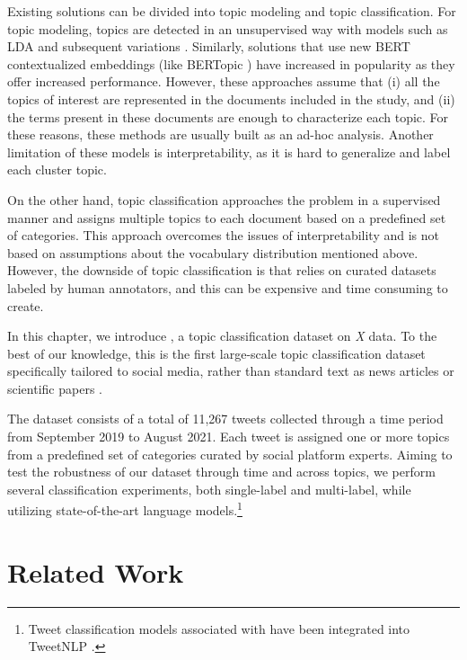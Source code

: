 Existing solutions can be divided into topic modeling and topic classification. For topic modeling, topics are detected in an unsupervised way with models such as \ac{LDA} \cite{lda} and subsequent variations \cite{steyvers2007probabilistic}. 
Similarly, solutions that use new BERT contextualized embeddings (like BERTopic \cite{bertopic}) have increased in popularity as they offer increased performance. 
However, these approaches assume that (i) all the topics of interest are represented in the documents included in the study, and (ii) the terms present in these documents are enough to characterize each topic. For these reasons, these methods are usually built as an ad-hoc analysis.  Another limitation of these models is interpretability, as it is hard to generalize and label each cluster topic.

On the other hand, topic classification approaches the problem in a supervised manner and assigns multiple topics to each document based on a predefined set of categories. This approach overcomes the issues of interpretability and is not based on assumptions about the vocabulary distribution mentioned above. However, the downside of topic classification is that relies on curated datasets labeled by human annotators, and this can be expensive and time consuming to create.

In this chapter, we introduce \TweetTopic, a topic classification dataset on \textit{X} data. To the best of our knowledge, this is the first large-scale topic classification dataset specifically tailored to social media, rather than standard text as news articles \cite{greene2006practical} or scientific papers \cite{lazaridou2021mind}. 

The dataset consists of a total of 11,267 tweets collected through a time period from September 2019 to August 2021. Each tweet is assigned one or more topics from a predefined set of categories curated by social platform experts. Aiming to test the robustness of our dataset through time and across topics, we perform several classification experiments, both single-label and multi-label, while utilizing state-of-the-art language models.\footnote{Tweet classification models associated with \TweetTopic have been integrated into TweetNLP \cite{camacho2022tweetnlp}.} 

\section{Related Work}
